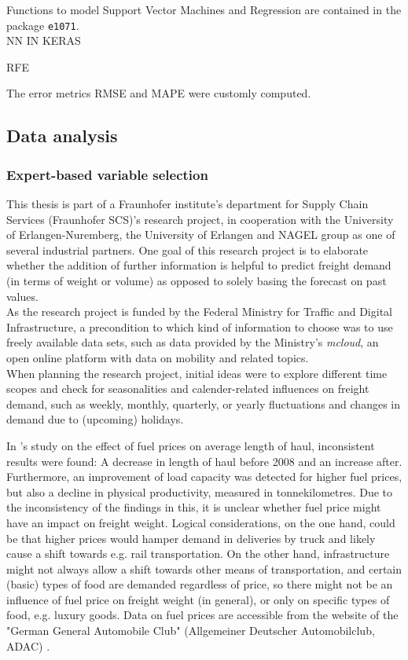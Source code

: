 \documentclass[a4paper, 11pt]{article}
\begin{document}
Functions to model Support Vector Machines and Regression are contained in the package \texttt{e1071}.\\

NN IN KERAS

RFE

The error metrics RMSE and MAPE were customly computed.\\





\subsection{Data analysis}

\subsubsection{Expert-based variable selection}

This thesis is part of a Fraunhofer institute's department for Supply Chain Services (Fraunhofer SCS)'s research project, in cooperation with the University of Erlangen-Nuremberg, the University of Erlangen and NAGEL group as one of several industrial partners. 
One goal of this research project is to elaborate whether the addition of further information is helpful to predict freight demand (in terms of weight or volume) as opposed to solely basing the forecast on past values.\\
As the research project is funded by the Federal Ministry for Traffic and Digital Infrastructure, a precondition to which kind of information to choose was to use freely available data sets, such as data provided by the Ministry's \textit{mcloud}, an open online platform with data on mobility and related topics. \\
When planning the research project, initial ideas were to explore different time scopes and check for seasonalities and calender-related influences on freight demand, such as weekly, monthly, quarterly, or yearly fluctuations and changes in demand due to (upcoming) holidays. \

In \cite{Abate.2014}'s study on the effect of fuel prices on average length of haul, inconsistent results were found: A decrease in length of haul before 2008 and an increase after. Furthermore, an improvement of load capacity was detected for higher fuel prices, but also a decline in physical productivity, measured in tonnekilometres.
Due to the inconsistency of the findings in this, it is unclear whether fuel price might have an impact on freight weight. Logical considerations, on the one hand, could be that higher prices would hamper demand in deliveries by truck and likely cause a shift towards e.g. rail transportation. On the other hand, infrastructure might not always allow a shift towards other means of transportation, and certain (basic) types of food are demanded regardless of price, so there might not be an influence of fuel price on freight weight (in general), or only on specific types of food, e.g. luxury goods.
Data on fuel prices are accessible from the website of the "German General Automobile Club" (Allgemeiner Deutscher Automobilclub, ADAC) \citep{ADAC.}.\
\end{document}
